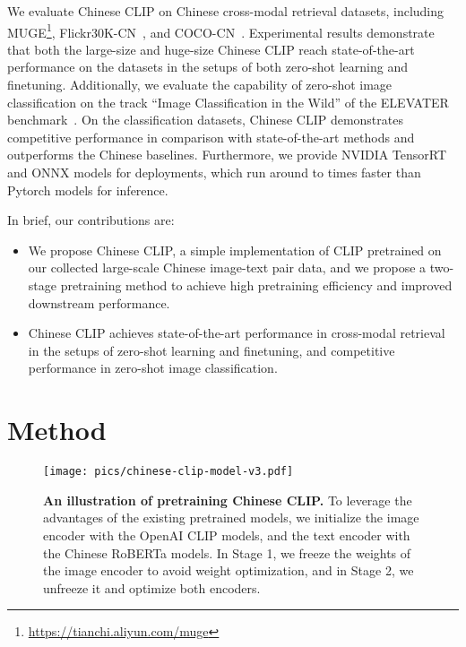 \documentclass[11pt]{article}
\begin{document}
We evaluate Chinese CLIP on  Chinese cross-modal retrieval datasets, including MUGE\footnote{\url{https://tianchi.aliyun.com/muge}}, Flickr30K-CN~\citep{flickr30k-cn}, and COCO-CN~\citep{coco-cn}. Experimental results demonstrate that both the large-size and huge-size Chinese CLIP reach state-of-the-art performance on the  datasets in the setups of both zero-shot learning and finetuning. 
Additionally, we evaluate the capability of zero-shot image classification on the track ``Image Classification in the Wild'' of the ELEVATER benchmark~\citep{elevater}. 
On the classification datasets, Chinese CLIP demonstrates competitive performance in comparison with state-of-the-art methods and outperforms the Chinese baselines. 
Furthermore, we provide NVIDIA TensorRT and ONNX models for deployments, which run around  to  times faster than Pytorch models for inference. 








In brief, our contributions are:
\begin{itemize}
    \item We propose Chinese CLIP, a simple implementation of CLIP pretrained on our collected large-scale Chinese image-text pair data, and we propose a two-stage pretraining method to achieve high pretraining efficiency and improved downstream performance.
    \item Chinese CLIP achieves state-of-the-art performance in cross-modal retrieval in the setups of zero-shot learning and finetuning, and competitive performance in zero-shot image classification. 
\end{itemize}
 
\section{Method}

\begin{figure}[t] 
    \centering
    \texttt{[image: pics/chinese-clip-model-v3.pdf]}
    \caption{\textbf{An illustration of pretraining Chinese CLIP.} To leverage the advantages of the existing pretrained models, we initialize the image encoder with the OpenAI CLIP models, and the text encoder with the Chinese RoBERTa models. In Stage 1, we freeze the weights of the image encoder to avoid weight optimization, and in Stage 2, we unfreeze it and optimize both encoders. }
    \label{fig:model}
\end{figure}
\end{document}
